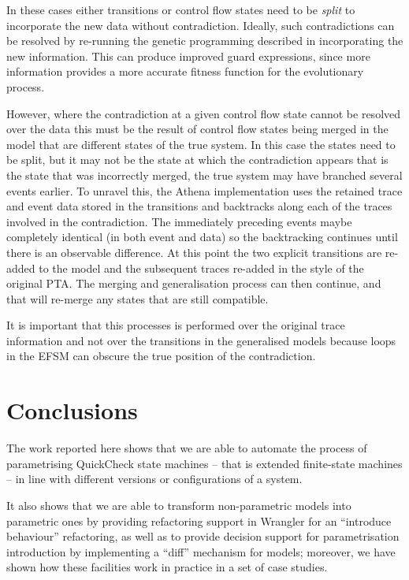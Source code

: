 In these cases either transitions or control flow states need to be \emph{split} to incorporate the new data without contradiction. Ideally, such contradictions can be resolved by re-running the genetic programming described in  incorporating the new information. This can produce improved guard expressions, since more information provides a more accurate fitness function for the evolutionary process. 

However, where the contradiction at a given control flow state cannot be resolved over the data this must be the result of control flow states being merged in the model that are different states of the true system. In this case the states need to be split, but it may not be the state at which the contradiction appears that is the state that was incorrectly merged, the true system may have branched several events earlier. To unravel this, the Athena implementation uses the retained trace and event data stored in the transitions and backtracks along each of the traces involved in the contradiction. The immediately preceding events maybe completely identical (in both event and data) so the backtracking continues until there is an observable difference. At this point the two explicit transitions are re-added to the model and the subsequent traces re-added in the style of the original PTA. The merging and generalisation process can then continue, and that will re-merge any states that are still compatible.

It is important that this processes is performed over the original trace information and not over the transitions in the generalised models because loops in the EFSM can obscure the true position of the contradiction.

\section{Conclusions}
\label{concs}

The work reported here shows that we are able to automate the process of parametrising QuickCheck state machines -- that 
is extended finite-state machines -- in line with different versions or configurations of a system.

It also shows that we are able to transform non-parametric models into parametric ones by providing refactoring support in Wrangler for an ``introduce behaviour'' refactoring, as well as to provide decision support for parametrisation introduction by implementing a ``diff'' mechanism for models; moreover, we have shown how these facilities work in practice in a set of case studies.

